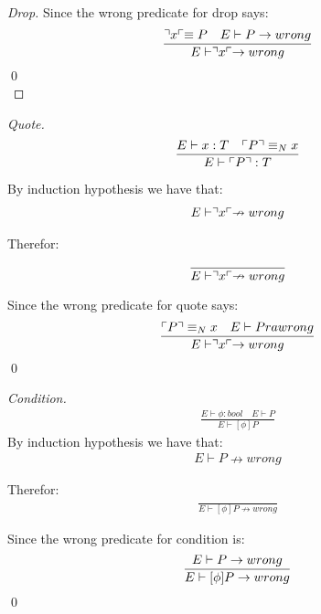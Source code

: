 \begin{theorem}
\begin{proof}[Drop]
        Since the wrong predicate for drop says:
        \begin{align*}
            \frac{\urcorner x \ulcorner \equiv P \quad E \vdash P \rightarrow wrong}{E \vdash \urcorner x \ulcorner \rightarrow wrong}
        \end{align*}
        \qed\\
    \end{proof}

    \begin{proof}[Quote]
        \begin{align*}
            \frac{E \vdash x:T \quad \ulcorner P \urcorner \equiv _N x}{E \vdash \ulcorner P \urcorner:T}
        \end{align*}

        By induction hypothesis we have that:
        \begin{align*}
            E \vdash \urcorner x \ulcorner \nrightarrow wrong
        \end{align*}

        Therefor:
        \begin{align*}
            \frac{}{E \vdash \urcorner x \ulcorner \nrightarrow wrong}
        \end{align*}

        Since the wrong predicate for quote says:
        \begin{align*}
            \frac{\ulcorner P \urcorner \equiv _N x \quad E \vdash P ra wrong}{E \vdash \urcorner x \ulcorner \rightarrow wrong}
        \end{align*}
        \qed
    \end{proof}

    \begin{proof}[Condition]
        \begin{align*}
            \frac{E \vdash \phi : bool \quad E \vdash P}{E \vdash [\phi]P}
        \end{align*}
        By induction hypothesis we have that:
        \begin{align*}
            E \vdash P \nrightarrow wrong
        \end{align*}

        Therefor:
        \begin{align*}
            \frac{}{E \vdash [\phi ]P \nrightarrow wrong}
        \end{align*}

        Since the wrong predicate for condition is:
        \begin{align*}
            \frac{E \vdash P \rightarrow wrong}{E \vdash [\phi ]P \rightarrow wrong}
        \end{align*}
        \qed
    \end{proof}
\end{theorem}






